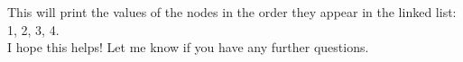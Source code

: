 \documentclass[preview]{standalone}
\begin{document}
This will print the values of the nodes in the order they appear in the linked list: 1, 2, 3, 4.\\I hope this helps! Let me know if you have any further questions.\\
\end{document}
